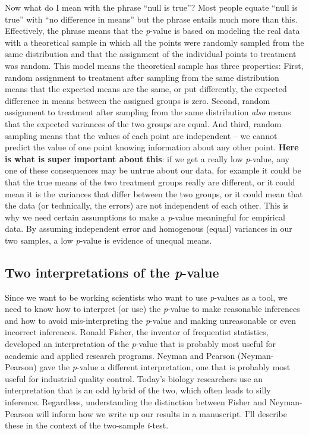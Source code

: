 \documentclass[]{book}
\begin{document}
Now what do I mean with the phrase ``null is true''? Most people equate ``null is true'' with ``no difference in means'' but the phrase entails much more than this. Effectively, the phrase means that the \emph{p}-value is based on modeling the real data with a theoretical sample in which all the points were randomly sampled from the same distribution and that the assignment of the individual points to treatment was random. This model means the theoretical sample has three properties: First, random assignment to treatment after sampling from the same distribution means that the expected means are the same, or put differently, the expected difference in means between the assigned groups is zero. Second, random assignment to treatment after sampling from the same distribution \emph{also} means that the expected variances of the two groups are equal. And third, random sampling means that the values of each point are independent -- we cannot predict the value of one point knowing information about any other point. \textbf{Here is what is super important about this}: if we get a really low \emph{p}-value, any one of these consequences may be untrue about our data, for example it could be that the true means of the two treatment groups really are different, or it could mean it is the variances that differ between the two groups, or it could mean that the data (or technically, the errors) are not independent of each other. This is why we need certain assumptions to make a \emph{p}-value meaningful for empirical data. By assuming independent error and homogenous (equal) variances in our two samples, a low \emph{p}-value is evidence of unequal means.

\hypertarget{two-interpretations-of-the-p-value}{%
\subsection{\texorpdfstring{Two interpretations of the \emph{p}-value}{Two interpretations of the p-value}}\label{two-interpretations-of-the-p-value}}

Since we want to be working scientists who want to use \emph{p}-values as a tool, we need to know how to interpret (or use) the \emph{p}-value to make reasonable inferences and how to avoid mis-interpreting the \emph{p}-value and making unreasonable or even incorrect inferences. Ronald Fisher, the inventor of frequentist statistics, developed an interpretation of the \emph{p}-value that is probably most useful for academic and applied research programs. Neyman and Pearson (Neyman-Pearson) gave the \emph{p}-value a different interpretation, one that is probably most useful for industrial quality control. Today's biology researchers use an interpretation that is an odd hybrid of the two, which often leads to silly inference. Regardless, understanding the distinction between Fisher and Neyman-Pearson will inform how we write up our results in a manuscript. I'll describe these in the context of the two-sample \emph{t}-test.
\end{document}
